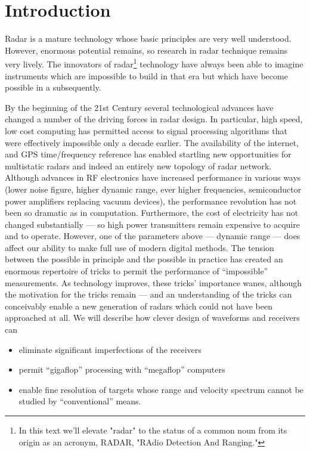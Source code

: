 \chapter{Introduction}

Radar is  a mature technology whose basic principles are very well 
understood. However, enormous potential remains, so research in 
radar technique remains very lively.  The innovators of radar\footnote{In this text we'll 
elevate "radar" to the status of a common noun from its origin as an acronym, 
RADAR, "RAdio Detection And Ranging."} technology have always 
been able to imagine instruments which are impossible to build in that era
but which have become possible in a subsequently.

By the beginning of the 21st Century several technological advances have changed a number
of the driving forces in radar design.  In particular, high speed, low
cost computing has permitted access to signal processing algorithms that
were effectively impossible only a decade earlier.  The availability
of the internet, and GPS time/frequency reference has enabled startling
new opportunities for multistatic radars and indeed an entirely new
topology of radar network.  Although advances in RF electronics
have increased performance in various ways (lower noise figure, higher
dynamic range, ever higher frequencies, semiconductor power amplifiers
replacing vacuum devices), the performance revolution has not been so
dramatic as in computation.  Furthermore, the cost of electricity has
not changed substantially --- so high power transmitters remain
expensive to acquire and to operate.  However, one of the parameters
above --- dynamic range --- does affect our ability to make full use
of modern digital methods. 
The tension between the possible in principle and the possible in
practice has created an enormous repertoire of tricks to permit the
performance of ``impossible'' measurements.  As technology improves,
these tricks' importance wanes, although the motivation for the tricks
remain --- and an understanding of the tricks can conceivably enable a
new generation of radars which could not have been approached at all.
We will describe how clever design of waveforms and receivers can 
\begin{itemize}
\item eliminate significant imperfections of the receivers
\item permit ``gigaflop'' processing with ``megaflop'' computers
\item enable fine resolution of targets whose range and velocity
spectrum cannot be studied by ``conventional'' means.
\end{itemize}

